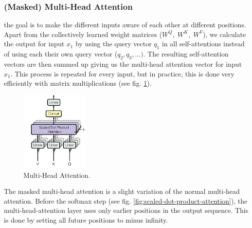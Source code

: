 \subsubsection{(Masked) Multi-Head Attention}\label{sec:multheadat}
the goal is to make the different inputs aware of each other at different positions. Apart from the collectively learned weight matrices ($W^Q,\;W^K,\;W^V$), we calculate the output for input $x_1$ by using the query vector $q_1$ in all self-attentions instead of using each their own query vector ($q_2, q_3, ...)$. The resulting self-attention vectors are then summed up giving us the multi-head attention vector for input $x_1$. This process is repeated for every input, but in practice, this is done very efficiently with matrix multiplications (see fig. \ref{fig:multi-head-attention}).
\begin{figure}[H]
    \centering
    \includegraphics[width=0.3\textwidth]{figures/multi-head-attention}
    \caption{Multi-Head Attention. \cite{vaswani2017attention}}
    \label{fig:multi-head-attention}
\end{figure}

The masked multi-head attention is a slight variation of the normal multi-head attention. Before the softmax step (see fig. \ref{fig:scaled-dot-product-attention}), the multi-head-attention layer uses only earlier positions in the output sequence. This is done by setting all future positions to minus infinity. 

